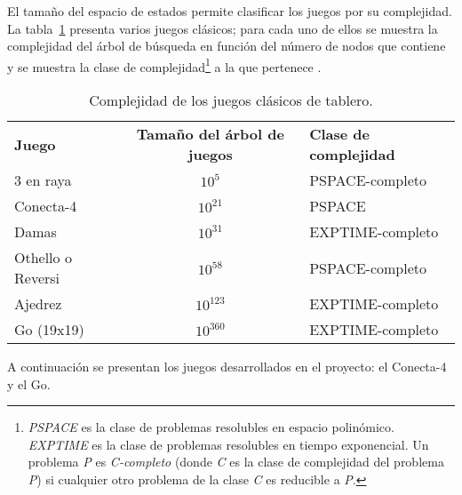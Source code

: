 El tamaño del espacio de estados permite clasificar los juegos por su complejidad.
La tabla~\ref{tab:complejidad_juegos} presenta varios juegos clásicos; para cada uno de ellos se muestra la complejidad del árbol de búsqueda en función del número de nodos que contiene y se muestra la clase de complejidad\footnote{\textit{PSPACE} es la clase de problemas resolubles en espacio polinómico. \textit{EXPTIME} es la clase de problemas resolubles en tiempo exponencial. Un problema \textit{P} es \textit{C-completo} (donde \textit{C} es la clase de complejidad del problema \textit{P}) si cualquier otro problema de la clase \textit{C} es reducible a \textit{P}.} a la que pertenece .
\begin{table}[!h]
\caption{Complejidad de los juegos clásicos de tablero.}
\label{tab:complejidad_juegos}	%
\begin{center}
\begin{tabular}{lcl}
\hline
\textbf{Juego} & \textbf{Tamaño del árbol de juegos} & \textbf{Clase de complejidad}\\
3 en raya & $10^{5}$ & PSPACE-completo\\
Conecta-4 & $10^{21}$ & PSPACE\\ 
Damas & $10^{31}$ & EXPTIME-completo\\
Othello o Reversi & $10^{58}$ & PSPACE-completo\\ 
Ajedrez & $10^{123}$ & EXPTIME-completo\\ 
Go (19x19) & $10^{360}$ & EXPTIME-completo\\
\hline
\end{tabular}
\end{center}
\end{table}

\bigskip
A continuación se presentan los juegos desarrollados en el proyecto: el Conecta-4 y el Go.










